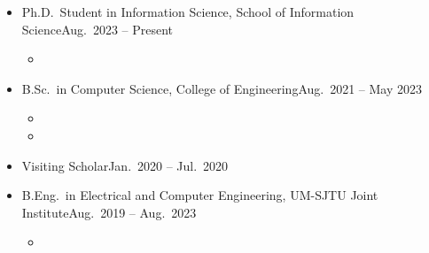 \documentclass[letterpaper,10.8pt]{article}
\begin{document}
\begin{itemize}
      \item {}
            {Ph.D.\ Student in Information Science, School of Information Science}{Aug.\ 2023 -- Present}
            \begin{itemize}
                  \item {}
            \end{itemize}

      \item {}
            {B.Sc.\ in Computer Science, College of Engineering}{Aug.\ 2021 -- May 2023}
            \begin{itemize}
                  \item {}
                  \item {}
            \end{itemize}

      \item {}
            {Visiting Scholar}{Jan.\ 2020 -- Jul.\ 2020}

      \item {}
            {B.Eng.\ in Electrical and Computer Engineering, UM-SJTU Joint Institute}{Aug.\ 2019 -- Aug.\ 2023}
            \begin{itemize}
                  \item {}
            \end{itemize}
\end{itemize}

\end{document}
